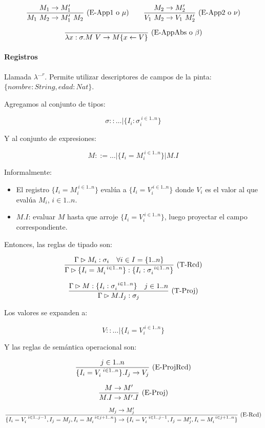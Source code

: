 \[\frac{M_1 \to M_1'}{M_1\ M_2 \to M_1'\ M_2}\ \text{(E-App1 o $\mu$)}\quad\quad \frac{M_2 \to M_2'}{V_1\ M_2 \to V_1\ M_2'}\ \text{(E-App2 o $\nu$)}\]

\[\frac{}{\lambda x:\sigma.M\ V \to M\{x\leftarrow V\}}\ \text{(E-AppAbs o $\beta$)}\]

\paragraph{Registros}

Llamada $\lambda^{\dots r}$. Permite utilizar descriptores de campos de la pinta: $\{nombre: String, edad: Nat\}$.

Agregamos al conjunto de tipos:

\[\sigma :: \dots \vert \{I_i : \sigma_i^{\ i \in 1..n}\}\]

Y al conjunto de expresiones:

\[M ::= \dots \vert \{I_i = M_i^{\ i \in 1..n}\} \vert M.I\]

Informalmente:
\begin{itemize}
  \item El registro $\{I_i = M_i^{\ i \in 1..n}\}$ evalúa a $\{I_i = V_i^{\ i \in 1..n}\}$ donde $V_i$ es el valor al que evalúa $M_i$, $i \in 1..n$.
  \item $M.I$: evaluar $M$ hasta que arroje $\{I_i = V_i^{\ i \in 1..n}\}$, luego proyectar el campo correspondiente.
\end{itemize}

Entonces, las reglas de tipado son:

\[\frac{\Gamma \rhd M_i : \sigma_i\quad \forall i \in I = \{1..n\}}{\Gamma \rhd \{I_i = M_i^{\ i \in 1..n}\}:\{I_i : \sigma_i^{\ i \in 1..n}\}}\ \text{(T-Rcd)}\]

\[\frac{\Gamma \rhd M : \{I_i : \sigma_{i}^{\ i \in 1..n}\}\quad j\in 1..n}{\Gamma \rhd M.I_j : \sigma_j}\ \text{(T-Proj)}\]

Los valores se expanden a:

\[V :: \dots \vert \{I_i = V_i^{\ i \in 1..n}\}\]

Y las reglas de semántica operacional son:

\[\frac{j \in 1..n}{\{I_i = V_i^{\ i \in 1..n}\}.I_j \to V_j}\ \text{(E-ProjRcd)}\]

\[\frac{M \to M'}{M.I \to M'.I}\ \text{(E-Proj)}\]

\[\deriv{M_j \to M_j'}{\{I_i = V_i^{\ i \in 1..j-1}, I_j = M_j, I_i = M_i^{\ i \in j+1..n}\} \to \{I_i = V_i^{\ i \in 1..j-1}, I_j = M_j', I_i = M_i^{\ i \in j+1..n}\}}{E-Rcd}\]

